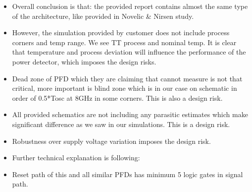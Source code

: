 \documentclass{article}
\begin{document}
\begin{itemize}
	\item Overall conclusion is that: the provided report contains almost the same type of the architecture, like provided in Novelic \& Nirsen study. 
	\item However, the simulation provided by customer does not include process corners and temp range. We see TT process and nominal temp. It is clear that temperature and process deviation will influence the performance of the power detector, which imposes the design risks. %
	\item Dead zone of PFD which they are claiming that cannot measure is not that critical, more important is blind zone which is in our case on schematic in order of 0.5*Tosc at 8GHz in some corners. This is also a design risk. 
	\item All provided schematics are not including any parasitic estimates which make significant difference as we saw in our simulations. This is a design risk. 
	\item Robustness over supply voltage variation imposes the design risk.
	\item Further technical explanation is following:
	\item Reset path of this and all similar PFDs has minimum 5 logic gates in signal path.
	

\end{itemize}
\end{document}
